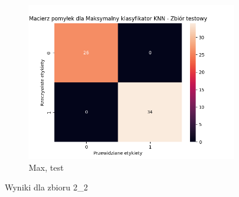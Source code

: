 \documentclass[12pt]{article}
\newcommand*{\subfigwidth}{0.24\textwidth}
\begin{document}
\begin{figure}[H]
\begin{subfigure}[t]{\subfigwidth}
        \includegraphics[width=\linewidth]{img/exp_2/knn/2_2/max/test_matrix.png}
        \caption{Max, test}
    \end{subfigure} 
    
    \caption{Wyniki dla zbioru 2\_2}
\end{figure}
\end{document}
